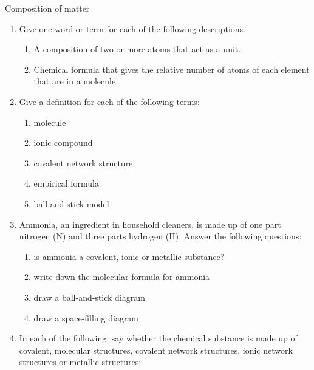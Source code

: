             \begin{eocexercises}{Composition of matter}
            \nopagebreak \noindent
            \label{m38120*id311490}\begin{enumerate}[noitemsep, label=\textbf{\arabic*}. ] 
            \label{m38120*uid87}\item Give one word or term for each of the following 
descriptions.
\label{m38120*id34411506}\begin{enumerate}[noitemsep, label=\textbf{\alph*}. ] 
            \label{m38120*uid90}\item A composition of two or more atoms that act as a unit.
\label{m38120*uid9221}\item Chemical formula that gives the relative number of atoms 
of each element that are in a molecule.
\end{enumerate}
\label{m38120*uid227}\item Give a definition for each of the following terms: 
\label{m38120*id311506}\begin{enumerate}[noitemsep, label=\textbf{\alph*}. ] 
            \label{m38120*uid930}\item molecule
\label{m38120*uid91}\item ionic compound
\item covalent network structure
\item empirical formula
\item ball-and-stick model\end{enumerate}
\label{m38120*uid92}\item Ammonia, an ingredient in household cleaners, is made up of one part nitrogen ($\text{N}$) and three parts hydrogen ($\text{H}$). Answer the following questions:
\label{m38120*id311590}\begin{enumerate}[noitemsep, label=\textbf{\alph*}. ] 
            \label{m38120*uid94}\item is ammonia a covalent, ionic or metallic substance?
\label{m38120*uid95}\item write down the molecular formula for ammonia
\label{m38120*uid96}\item draw a ball-and-stick diagram
\label{m38120*uid97}\item draw a space-filling diagram
\end{enumerate}
            \label{m38120*uid11}\item In each of the following, say whether the chemical substance is made up of covalent, molecular structures, covalent network structures, ionic network structures or metallic structures:

\end{enumerate}
\end{eocexercises}

